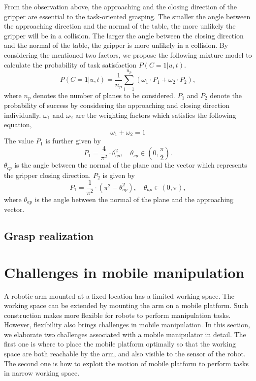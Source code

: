 From the observation above, the approaching and the closing direction of the gripper are essential to the task-oriented grasping. The smaller the angle between the approaching direction and the normal of the table, the more unlikely the gripper will be in a collision. The larger the angle between the closing direction and the normal of the table, the gripper is more unlikely in a collision. By considering the mentioned two factors, we propose the following mixture model to calculate the probability of task satisfaction $P(C = 1|u, t)$.  
\begin{equation}
P(C = 1|u, t) = \frac{1}{n_p} \sum_{i =1}^{n_p} (\omega_1 \cdot P_1 + \omega_2 \cdot P_2), 
\end{equation}
where $n_p$ denotes the number of planes to be considered. $P_1$ and $P_2$ denote the probability of success by considering the approaching and closing direction individually. $\omega_1$ and $\omega_2$ are the weighting factors which satisfies the following equation,
\begin{equation}
\omega_1 +  \omega_2 = 1
\end{equation}
The value $P_1$ is further given by 
\begin{equation}
P_1 = \frac{4}{\pi^2} \cdot \theta_{cp}^2, \quad \theta_{cp}\in(0,\frac{\pi}{2}). 
\end{equation}
$\theta_{cp}$ is the angle between the normal of the plane and the vector which represents the gripper closing direction. $P_2$ is given by 
\begin{equation}
P_1 = \frac{1}{\pi^2} \cdot (\pi^2 - \theta_{ap}^2 ), \quad \theta_{ap}\in(0, \pi),
\end{equation} 
where $\theta_{ap}$ is the angle between the normal of the plane and the approaching vector. 










																					

\subsection{Grasp realization}


\section{Challenges in mobile manipulation} \label{sec:challengesmb}
A robotic arm mounted at a fixed location has a limited working space. The working space can be extended by mounting the arm on a mobile platform. Such construction makes more flexible for robots to perform manipulation tasks. However, flexibility also brings challenges in mobile manipulation. In this section, we elaborate two challenges associated with a mobile manipulator in detail. The first one is where to place the mobile platform optimally so that the working space are both reachable by the arm, and also visible to the sensor of the robot. The second one is how to exploit the motion of mobile platform to perform tasks in narrow working space. 
  

